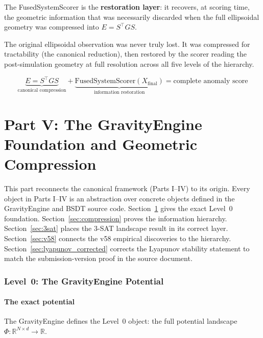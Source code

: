 \documentclass[11pt,a4paper]{article}
\theoremstyle{definition}
\newcommand{\R}{\mathbb{R}}
\begin{document}
The FusedSystemScorer is the \textbf{restoration layer}: it recovers,
at scoring time, the geometric information that was necessarily discarded
when the full ellipsoidal geometry was compressed into $E = S^\top GS$.

The original ellipsoidal observation was never truly lost.
It was compressed for tractability (the canonical reduction),
then restored by the scorer reading the post-simulation geometry
at full resolution across all five levels of the hierarchy.

\begin{equation}
\boxed{
\underbrace{E = S^\top GS}_{\text{canonical compression}} +
\underbrace{\text{FusedSystemScorer}(X_\text{final})}_{\text{information restoration}}
= \text{complete anomaly score}
}
\end{equation}

\newpage
\part*{Part V: The GravityEngine Foundation and Geometric Compression}

\noindent
This part reconnects the canonical framework (Parts I--IV) to its origin.
Every object in Parts I--IV is an abstraction over concrete objects defined in the
GravityEngine and BSDT source code.
Section~\ref{sec:gravity} gives the exact Level~0 foundation.
Section~\ref{sec:compression} proves the information hierarchy.
Section~\ref{sec:3sat} places the 3-SAT landscape result in its correct layer.
Section~\ref{sec:v58} connects the v58 empirical discoveries to the hierarchy.
Section~\ref{sec:lyapunov_corrected} corrects the Lyapunov stability statement
to match the submission-version proof in the source document.

\section{Level~0: The GravityEngine Potential}
\label{sec:gravity}

\subsection{The exact potential}

The GravityEngine defines the Level~0 object: the full potential landscape
$\Phi : \R^{N\times d}\to\R$.
\end{document}

